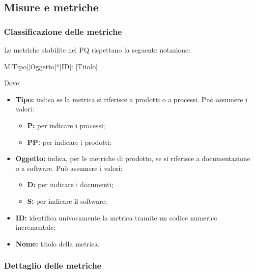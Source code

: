 \documentclass[../NormediProgetto.tex]{subfiles}
\begin{document}
\subsection{Misure e metriche}

\subsubsection*{Classificazione delle metriche}

Le metriche stabilite nel PQ rispettano la seguente notazione:

    \begin{center}
        M[Tipo][Oggetto]*[ID]: [Titolo]
    \end{center}
    
Dove:

\begin{itemize}
    \item \textbf{Tipo:} indica se la metrica si riferisce a prodotti o a processi. Può assumere i valori:
    
    \begin{itemize}
        \item \textbf{P:} per indicare i processi;
        \item \textbf{PP:} per indicare i prodotti;
    \end{itemize}
    
    \item \textbf{Oggetto:} indica, per le metriche di prodotto, se si riferisce a documentazione o a software. Può assumere i valori:
    
    \begin{itemize}
        \item \textbf{D:} per indicare i documenti;
        \item \textbf{S:} per indicare il software;
    \end{itemize}
    
    \item \textbf{ID:} identifica univocamente la metrica tramite un codice numerico incrementale;
    
    \item \textbf{Nome:} titolo della metrica.
\end{itemize}

\subsubsection*{Dettaglio delle metriche}
\end{document}

